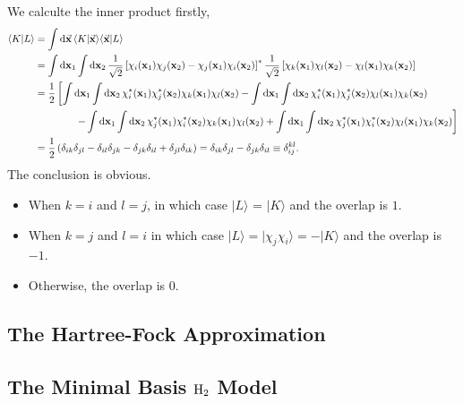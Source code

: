 \documentclass[a4paper]{book}
\newcommand*{\dif}{\mathop{}\!\mathrm{d}}
\newcommand{\bfx}{{\bf x}}
\begin{document}
	\begin{solution}
	We calculte the inner product firstly,
	\begin{align}
		\langle K | L \rangle &= \int \dif \vec{\bfx} \, \langle K | \vec{\bfx} \rangle \langle \vec{\bfx} | L \rangle \notag \\
		&= \int \dif \bfx_1 \int \dif \bfx_2 \, \frac{1}{\sqrt{2}}\left[ \chi_i(\bfx_1) \chi_j(\bfx_2) - \chi_j(\bfx_1) \chi_i(\bfx_2) \right]^* \frac{1}{\sqrt{2}}\left[ \chi_k(\bfx_1) \chi_l(\bfx_2) - \chi_l(\bfx_1) \chi_k(\bfx_2) \right] \notag \\
		&= \frac{1}{2} \left[ \int \dif \bfx_1 \int \dif \bfx_2 \, \chi^*_i(\bfx_1) \chi^*_j(\bfx_2) \chi_k(\bfx_1) \chi_l(\bfx_2) - \int \dif \bfx_1 \int \dif \bfx_2 \, \chi^*_i(\bfx_1) \chi^*_j(\bfx_2) \chi_l(\bfx_1) \chi_k(\bfx_2)\right. \notag \\
		&\hspace{4em} \left. - \int \dif \bfx_1 \int \dif \bfx_2 \, \chi^*_j(\bfx_1) \chi^*_i(\bfx_2) \chi_k(\bfx_1) \chi_l(\bfx_2) + \int \dif \bfx_1 \int \dif \bfx_2 \, \chi^*_j(\bfx_1) \chi^*_i(\bfx_2) \chi_l(\bfx_1) \chi_k(\bfx_2) \right] \notag \\
		&= \frac{1}{2} \left( \delta_{ik} \delta_{jl} - \delta_{il}\delta_{jk} - \delta_{jk} \delta_{il} + \delta_{jl}\delta_{ik}\right) = \delta_{ik}\delta_{jl} - \delta_{jk} \delta_{il} \equiv \delta^{kl}_{ij}.
	\end{align}
	The conclusion is obvious. 
	\begin{itemize}
	
	\item When $k=i$ and $l=j$, in which case $|L\rangle$ = $|K\rangle$ and the overlap is $1$.
	
	\item When $k=j$ and $l=i$ in which case $|L\rangle= |\chi_j \chi_i \rangle = -|K\rangle$ and the overlap is $-1$.
	
	\item Otherwise, the overlap is $0$.
	
	\end{itemize}
	\end{solution}
	
	\subsection{The Hartree-Fock Approximation}
	
	\subsection{The Minimal Basis \texorpdfstring{$\ce{H2}$}- Model}
	
\end{document}
